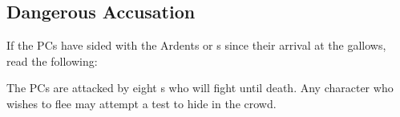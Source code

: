 \newpage
\subsection{Dangerous Accusation}

If the PCs have sided with the Ardents or \enemyQueensGuard{}s since their arrival at the gallows, read the following:


The PCs are attacked by eight \enemyRioter{}s who will fight until death. Any character who wishes to flee may attempt a  test to hide in the crowd.



